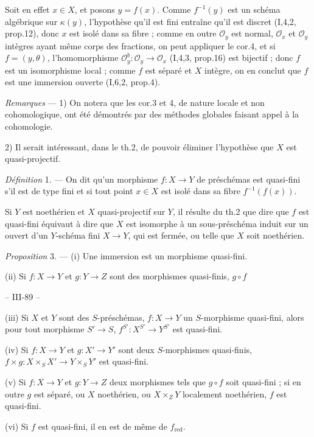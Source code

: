 Soit en effet $x \in X$, et posons $y=f(x)$. Comme $f^{-1}(y)$ est un schéma algébrique sur $\kappa(y)$, l'hypothèse qu'il est fini entraîne qu'il est discret (I,4,2, prop.12), donc $x$ est isolé dans sa fibre ; comme en outre $\mathcal{O}_y$ est normal, $\mathcal{O}_x$ et $\mathcal{O}_y$ intègres ayant même corps des fractions, on peut appliquer le cor.4, et si $f=(y,\theta)$, l'homomorphisme $\mathcal{O}_y^b : \mathcal{O}_y \to \mathcal{O}_x$ (I,4,3, prop.16) est bijectif ; donc $f$ est un isomorphisme local ; comme $f$ est séparé et $X$ intègre, on en conclut que $f$ est une immersion ouverte (I,6,2, prop.4).

\emph{Remarques} — 1) On notera que les cor.3 et 4, de nature locale et non cohomologique, ont été démontrés par des méthodes globales faisant appel à la cohomologie.

2) Il serait intéressant, dans le th.2, de pouvoir éliminer l'hypothèse que $X$ est quasi-projectif.

\emph{Définition} 1. — On dit qu'un morphisme $f : X \to Y$ de préschémas est quasi-fini s'il est de type fini et si tout point $x \in X$ est isolé dans sa fibre $f^{-1}(f(x))$.

Si $Y$ est noethérien et $X$ quasi-projectif sur $Y$, il résulte du th.2 que dire que $f$ est quasi-fini équivaut à dire que $X$ est isomorphe à un sous-préschéma induit sur un ouvert d'un $Y$-schéma fini $X \to Y$, qui est fermée, ou telle que $X$ soit noethérien.

\emph{Proposition} 3. — (i) Une immersion est un morphisme quasi-fini.

(ii) Si $f : X \to Y$ et $g : Y \to Z$ sont des morphismes quasi-finis, $g \circ f$

\newpage


-- III-89 --

(iii) Si $X$ et $Y$ sont des $S$-préschémas, $f: X \to Y$ un $S$-morphisme quasi-fini, alors pour tout morphisme $S' \to S$, $f^{S'}: X^{S'} \to Y^{S'}$ est quasi-fini.

(iv) Si $f: X \to Y$ et $g: X' \to Y'$ sont deux $S$-morphismes quasi-finis, $f \times g: X \times_S X' \to Y \times_S Y'$ est quasi-fini.

(v) Si $f: X \to Y$ et $g: Y \to Z$ deux morphismes tels que $g \circ f$ soit quasi-fini ; si en outre $g$ est séparé, ou $X$ noethérien, ou $X \times_Z Y$ localement noethérien, $f$ est quasi-fini.

(vi) Si $f$ est quasi-fini, il en est de même de $f_{\text{red}}$.

